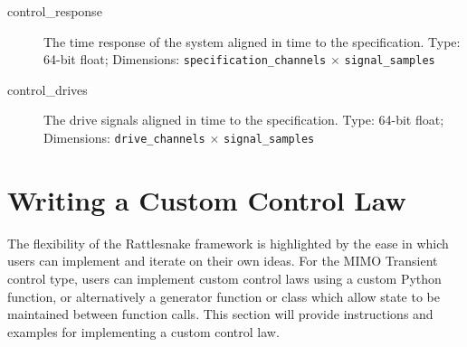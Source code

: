 \documentclass[pdf,12pt,report]{SANDreport}
\newcommand{\inlineCode}{\lstinline[basicstyle=\bfseries\ttfamily]}
\begin{document}
\begin{description}
        \item[control\_response] The time response of the system aligned in time to the specification. Type: 64-bit float; Dimensions: \inlineCode{specification_channels} $\times$ \inlineCode{signal_samples}
        
        \item[control\_drives] The drive signals aligned in time to the specification.  Type: 64-bit float; Dimensions: \inlineCode{drive_channels} $\times$ \inlineCode{signal_samples}
    \end{description}
    
    \section{Writing a Custom Control Law}\label{sec:rattlesnake_environments_custom_control_law_transient}
    The flexibility of the Rattlesnake framework is highlighted by the ease in which users can implement and iterate on their own ideas.  For the \Ac{MIMO} Transient control type, users can implement custom control laws using a custom Python function, or alternatively a generator function or class which allow state to be maintained between function calls.  This section will provide instructions and examples for implementing a custom control law.
    
\end{document}
